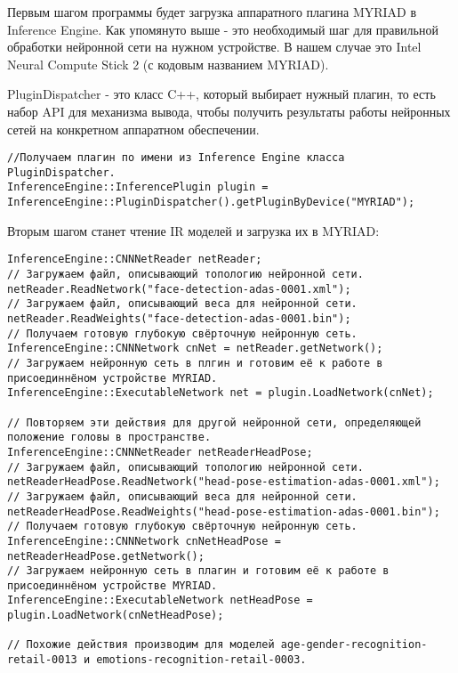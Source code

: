 \documentclass[14pt,a4paper]{scrartcl}
\begin{document}
			Первым шагом программы будет загрузка аппаратного плагина MYRIAD в Inference Engine. Как упомянуто выше - это необходимый шаг для правильной обработки нейронной сети на нужном устройстве. В нашем случае это Intel Neural Compute Stick 2 (с кодовым названием MYRIAD). 
			
			PluginDispatcher - это класс C++, который выбирает нужный плагин, то есть набор API для механизма вывода, чтобы
			получить результаты работы нейронных сетей на конкретном аппаратном обеспечении\cite{bib:Using_IE_API_Legacy}.
			
			\begin{verbatim}
//Получаем плагин по имени из Inference Engine класса PluginDispatcher.
InferenceEngine::InferencePlugin plugin = InferenceEngine::PluginDispatcher().getPluginByDevice("MYRIAD");
			\end{verbatim}
			
			Вторым шагом станет чтение IR моделей и загрузка их в MYRIAD:
			
			\begin{verbatim}
InferenceEngine::CNNNetReader netReader;
// Загружаем файл, описывающий топологию нейронной сети.
netReader.ReadNetwork("face-detection-adas-0001.xml");
// Загружаем файл, описывающий веса для нейронной сети.
netReader.ReadWeights("face-detection-adas-0001.bin");
// Получаем готовую глубокую свёрточную нейронную сеть.
InferenceEngine::CNNNetwork cnNet = netReader.getNetwork();
// Загружаем нейронную сеть в плгин и готовим её к работе в присоединнёном устройстве MYRIAD.
InferenceEngine::ExecutableNetwork net = plugin.LoadNetwork(cnNet);

// Повторяем эти действия для другой нейронной сети, определяющей положение головы в пространстве.
InferenceEngine::CNNNetReader netReaderHeadPose;
// Загружаем файл, описывающий топологию нейронной сети.
netReaderHeadPose.ReadNetwork("head-pose-estimation-adas-0001.xml");
// Загружаем файл, описывающий веса для нейронной сети.
netReaderHeadPose.ReadWeights("head-pose-estimation-adas-0001.bin");
// Получаем готовую глубокую свёрточную нейронную сеть.
InferenceEngine::CNNNetwork cnNetHeadPose = netReaderHeadPose.getNetwork();
// Загружаем нейронную сеть в плагин и готовим её к работе в присоединнёном устройстве MYRIAD.
InferenceEngine::ExecutableNetwork netHeadPose = plugin.LoadNetwork(cnNetHeadPose);

// Похожие действия производим для моделей age-gender-recognition-retail-0013 и emotions-recognition-retail-0003.	
			\end{verbatim}
			
\end{document}
